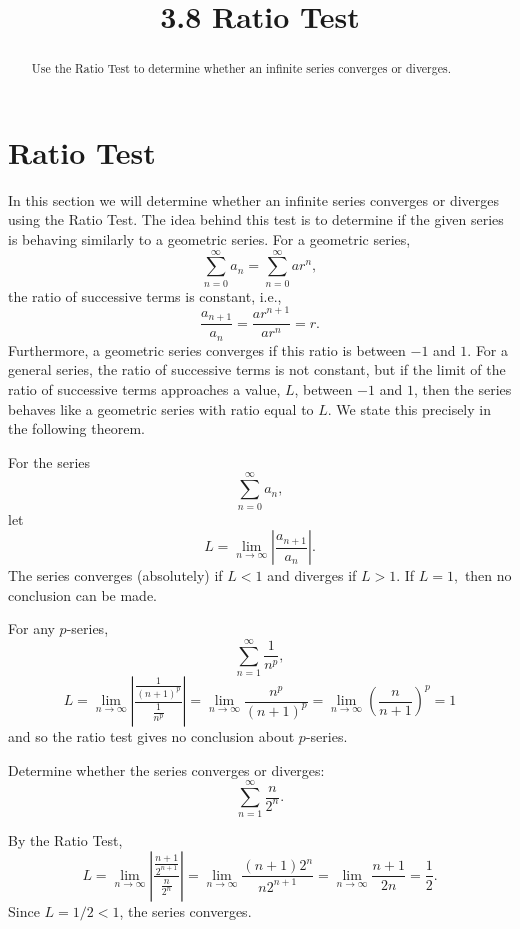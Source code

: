 \documentclass[handout]{ximera}
\title{3.8 Ratio Test}
\begin{document}
\begin{abstract}
Use the Ratio Test to determine whether an infinite series converges or diverges.
\end{abstract}

\maketitle

\section{Ratio Test}

In this section we will determine whether an infinite series converges or diverges using the Ratio Test. 
The idea behind this test is to determine if the given series is behaving similarly to a geometric series.
For a geometric series, 
\[
\sum_{n=0}^\infty a_n = \sum_{n=0}^\infty ar^n,
\]
the ratio of successive terms is constant, i.e., 
\[
\frac{a_{n+1}}{a_n} = \frac{ar^{n+1}}{ar^n} = r.
\]
Furthermore, a geometric series converges if this ratio is between $-1$ and $1$.
For a general series, the ratio of successive terms is not constant, but if the limit of the ratio of successive terms
approaches a value, $L$, between $-1$ and $1$, then the series behaves like a geometric series with ratio equal to $L$.
We state this precisely in the following theorem.

\begin{theorem}
For the series
\[
\sum_{n=0}^\infty a_n,
\]
let
\[
L = \lim_{n \to \infty} \left|\frac{a_{n+1}}{a_n}\right|.
\]
The series converges (absolutely) if $L < 1$ and diverges if $L>1$. 
If $L = 1,$ then no conclusion can be made.

\end{theorem}
 
\begin{remark}
For any $p$-series,
\[
\sum_{n=1}^\infty \frac{1}{n^p},
\]
\[
L =  \lim_{n \to \infty} \left|\frac{\frac{1}{(n+1)^p}}{\frac{1}{n^p}}\right| = \lim_{n \to \infty} \frac{n^p}{(n+1)^p} =  \lim_{n \to \infty} \left(\frac{n}{n+1}\right)^p = 1
\]
and so the ratio test gives no conclusion about $p$-series.
\end{remark}

\begin{example}[example 1]
Determine whether the series converges or diverges:
\[
\sum_{n=1}^\infty \frac{n}{2^n}.
\]

By the Ratio Test,
\[
L =  \lim_{n \to \infty} \left|\frac{\frac{n+1}{2^{n+1}}}{\frac{n}{2^n}}\right| =  \lim_{n \to \infty} \frac{(n+1)2^n}{n2^{n+1}} 
=  \lim_{n \to \infty} \frac{n+1}{2n} = \frac12.
\]
Since $L = 1/2 < 1$, the series converges.
\end{example}
\end{document}
